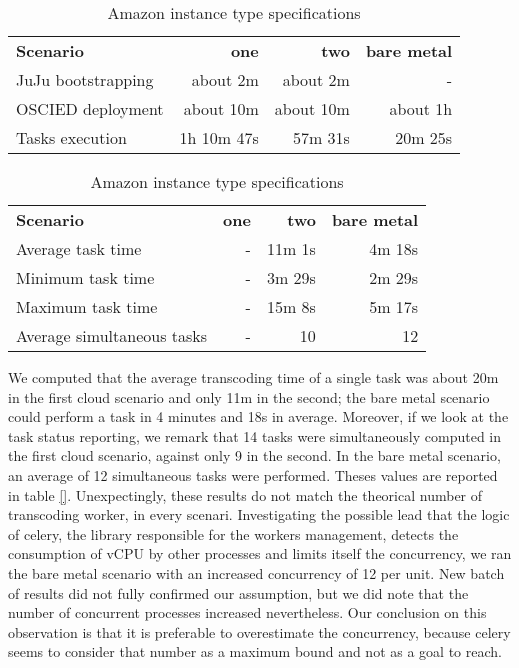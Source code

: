 \documentclass[a4paper, titlepage]{paper}
\numberwithin{figure}{section}
\numberwithin{table}{section}
\begin{document}
      \begin{table}
        \centering
        \begin{tabular}{lrrr}
          \textbf{Scenario}   & \textbf{one}  & \textbf{two}  & \textbf{bare metal} \\
          JuJu bootstrapping  & about 2m      & about 2m      & -        \\
          OSCIED deployment   & about 10m     & about 10m     & about 1h \\
          Tasks execution     & 1h 10m 47s    & 57m 31s       & 20m 25s
        \end{tabular}
        \caption{Amazon instance type specifications}
        \label{table:scenari-overall-times}
      \end{table}

      \begin{table}
        \centering
        \begin{tabular}{lrrr}
          \textbf{Scenario}           & \textbf{one}  & \textbf{two}  & \textbf{bare metal} \\
          Average task time           & -             & 11m 1s        & 4m 18s \\
          Minimum task time           & -             & 3m 29s        & 2m 29s \\
          Maximum task time           & -             & 15m 8s        & 5m 17s \\
          Average simultaneous tasks  & -             & 10            & 12
        \end{tabular}
        \caption{Amazon instance type specifications}
        \label{table:scenari-overall-times}
      \end{table}

      We computed that the average transcoding time of a single task was about 20m in the first cloud scenario and only 11m in the second; the bare metal scenario could perform a task in 4 minutes and 18s in average. Moreover, if we look at the task status reporting, we remark that 14 tasks were simultaneously computed in the first cloud scenario, against only 9 in the second. In the bare metal scenario, an average of 12 simultaneous tasks were performed. Theses values are reported in table \ref{}. Unexpectingly, these results do not match the theorical number of transcoding worker, in every scenari. Investigating the possible lead that the logic of celery, the library responsible for the workers management, detects the consumption of vCPU by other processes and limits itself the concurrency, we ran the bare metal scenario with an increased concurrency of 12 per unit. New batch of results did not fully confirmed our assumption, but we did note that the number of concurrent processes increased nevertheless. Our conclusion on this observation is that it is preferable to overestimate the concurrency, because celery seems to consider that number as a maximum bound and not as a goal to reach.
\end{document}

